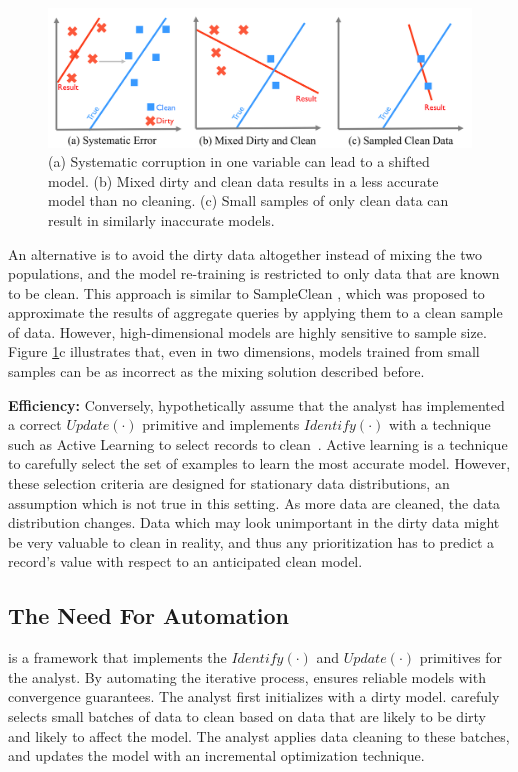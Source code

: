 \begin{figure}[ht!]
\centering
 \includegraphics[width=\columnwidth]{figs/update-arch.png}
 \caption{(a) Systematic corruption in one variable can lead to a shifted model. 
 (b) Mixed dirty and clean data results in a less accurate model than no cleaning.
(c) Small samples of only clean data can result in similarly inaccurate models. \label{update-arch1}}
\end{figure}

An alternative is to avoid the dirty data altogether instead of mixing the two populations, and the model re-training is restricted to only data that are known to be clean.
This approach is similar to SampleClean \cite{wang1999sample}, which was proposed to approximate the results of aggregate queries by applying them to a clean sample of data.
However, high-dimensional models are highly sensitive to sample size.
Figure \ref{update-arch1}c illustrates that, even in two dimensions, models trained from small samples can be as incorrect as the mixing solution described before.

\vspace{0.5em} 

\textbf{Efficiency: } Conversely, hypothetically assume that the analyst has implemented a correct $Update(\cdot)$ primitive and implements $Identify(\cdot)$ with a technique such as Active Learning to select records to clean~\cite{yakout2013don,DBLP:journals/pvldb/YakoutENOI11,gokhale2014corleone}.
Active learning is a technique to carefully select the set of examples to learn the most accurate model.
However, these selection criteria are designed for stationary data distributions, an assumption which is not true in this setting.
As more data are cleaned, the data distribution changes.
Data which may look unimportant in the dirty data might be very valuable to clean in reality, and thus any prioritization has to predict a record's value with respect to an anticipated clean model.

\subsection{The Need For Automation}\label{alrw}
\sys is a framework that implements the $Identify(\cdot)$ and $Update(\cdot)$ primitives for the analyst. 
By automating the iterative process, \sys ensures reliable models with convergence guarantees.
The analyst first initializes \sys with a dirty model.
\sys carefuly selects small batches of data to clean based on data that are likely to be dirty and likely to affect the model.
The analyst applies data cleaning to these batches, and \sys updates the model with an incremental optimization technique.

